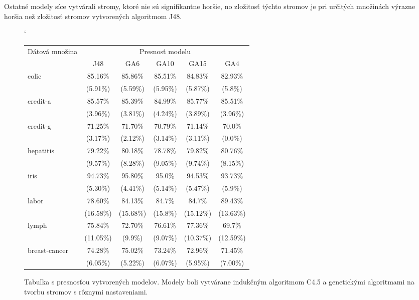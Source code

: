 Ostatné modely síce vytvárali stromy, ktoré nie sú signifikantne horšie, no zložitosť týchto stromov je pri určitých množinách výrazne horšia než zložitosť stromov vytvorených algoritmom J48.
\begin{figure}[h]
\catcode`
\centering 
\newcommand\T{\rule{0pt}{2.6ex}}       %
\newcommand\B{\rule[-1.2ex]{0pt}{0pt}} %
\begin{tabular}{|l||c|c|c|c|c||}
\hline \multirow{2}{*}{Dátová množina} & \multicolumn{5}{|c||}{Presnosť modelu} \\ 
\cline{2-6} & J48 & GA6 & GA10 & GA15 & GA4 \\
\hline
\hline \multirow{2}{*}{colic} & 85.16\% & 85.86\% & 85.51\% & 84.83\% & 82.93\% \T\\[-1.5ex]
& \tiny (5.91\%) & \tiny (5.59\%) & \tiny (5.95\%) & \tiny (5.87\%) & \tiny (5.8\%)\B\\
\hline \multirow{2}{*}{credit-a} & 85.57\% & 85.39\% & 84.99\% & 85.77\% & 85.51\% \T\\[-1.5ex]
& \tiny (3.96\%) & \tiny (3.81\%) & \tiny (4.24\%) & \tiny (3.89\%) & \tiny (3.96\%)\B\\
\hline \multirow{2}{*}{credit-g} & 71.25\% & 71.70\% & 70.79\% & 71.14\% & 70.0\%\T\\[-1.5ex]
& \tiny (3.17\%) & \tiny (2.12\%) & \tiny (3.14\%) & \tiny (3.11\%) & \tiny (0.0\%)\B\\
\hline \multirow{2}{*}{hepatitis} & 79.22\% & 80.18\% & 78.78\% & 79.82\% & 80.76\% \T\\[-1.5ex]
& \tiny (9.57\%) & \tiny (8.28\%) & \tiny (9.05\%) & \tiny (9.74\%) & \tiny (8.15\%)\B\\
\hline \multirow{2}{*}{iris} & 94.73\% & 95.80\% & 95.0\% & 94.53\% & 93.73\% \T\\[-1.5ex]
& \tiny (5.30\%) & \tiny (4.41\%) & \tiny (5.14\%) & \tiny (5.47\%) & \tiny (5.9\%)\B\\
\hline \multirow{2}{*}{labor} & 78.60\% & 84.13\% & 84.7\% & 84.7\% & 89.43\% \T\\[-1.5ex]
& \tiny (16.58\%) & \tiny (15.68\%) & \tiny (15.8\%) & \tiny (15.12\%) & \tiny (13.63\%)\B\\
\hline \multirow{2}{*}{lymph} & 75.84\% & 72.70\% & 76.61\% & 77.36\% & 69.7\% \T\\[-1.5ex]
& \tiny (11.05\%) & \tiny (9.9\%) & \tiny (9.07\%) & \tiny (10.37\%) & \tiny (12.59\%)\B\\
\hline \multirow{2}{*}{breast-cancer} & 74.28\% & 75.02\% & 73.24\% & 72.96\% & 71.45\% \T\\[-1.5ex]
& \tiny (6.05\%) & \tiny (5.22\%) & \tiny (6.07\%) & \tiny (5.95\%) & \tiny (7.00\%)\B\\
\hline
\end{tabular}
\caption{Tabuľka s presnosťou vytvorených modelov. Modely boli vytvárane indukčným algoritmom C4.5 a genetickými algoritmami na tvorbu stromov s rôznymi nastaveniami. }\label{fig:acc}
\end{figure}


